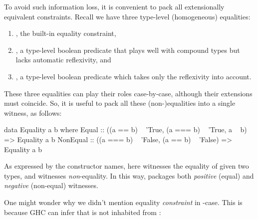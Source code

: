 \documentclass[demotion-paper.tex]{subfiles}
\begin{document}
To avoid such information loss, it is convenient to pack all extensionally equivalent constraints.
Recall we have three type-level (homogeneous) equalities:
\begin{enumerate}
\item {}, the built-in equality constraint,
\item {}, a type-level boolean predicate that plays well with compound types but lacks automatic reflexivity, and
\item {}, a type-level boolean predicate which takes only the reflexivity into account.
\end{enumerate}
These three equalities can play their roles case-by-case, although their extensions must coincide.
So, it is useful to pack all these (non-)equalities into a single witness, as follows:
\begin{code}
data Equality a b where
  Equal :: ((a == b) ~ 'True, (a === b) ~ 'True,
            a ~ b) => Equality a b
  NonEqual :: ((a === b) ~ 'False, 
              (a == b) ~ 'False) => Equality a b
\end{code}
As expressed by the constructor names, here  witnesses the equality of given two types, and  witnesses \emph{non}-equality.
In this way,  packages both \emph{positive} (equal) and \emph{negative} (non-equal) witnesses.

One might wonder why we didn't mention equality \emph{constraint}  in -case.
This is because GHC can infer that  is not inhabited from :
\end{document}
